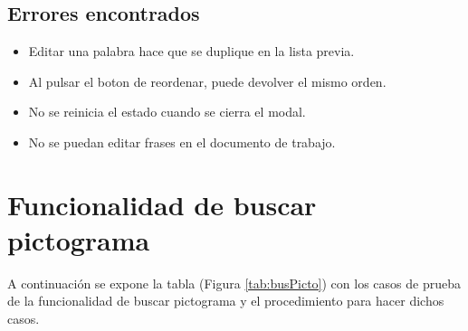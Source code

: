 \subsection{Errores encontrados}
\label{errores:v/f}
\begin{itemize}
    \item Editar una palabra hace que se duplique en la lista previa.
    \item Al pulsar el boton de reordenar, puede devolver el mismo orden.
    \item No se reinicia el estado cuando se cierra el modal.
    \item No se puedan editar frases en el documento de trabajo.
\end{itemize}

\section{Funcionalidad de buscar pictograma}
\label{planPruebas:busPicto}
A continuación se expone la tabla (Figura \ref{tab:busPicto}) con los casos de prueba de la funcionalidad de buscar pictograma y el procedimiento para hacer dichos casos.

\begin{table}[H]
    \caption{Casos de prueba de la funcionalidad de buscar pictograma.}
    \label{tab:busPicto}
\end{table}

